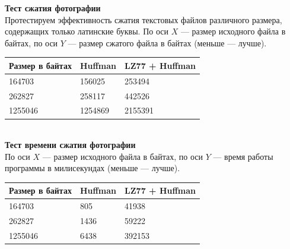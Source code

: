 \documentclass[12pt]{article}
\begin{document}
    \textbf{Тест сжатия фотографии} \\
    Протестируем эффективность сжатия текстовых файлов различного размера, 
    содержащих только латинские буквы. По оси $X$ — размер исходного файла в 
    байтах, по оси $Y$ — размер сжатого файла в байтах (меньше — лучше).


    \begin{tabular}{ | l | l | l | }
        \hline
            Размер в байтах & Huffman & LZ77 + Huffman \\ \hline
            164703          & 156025  & 253494         \\
            262827          & 258117  & 442526         \\
            1255046         & 1254869 & 2155391        \\
        \hline
    \end{tabular} \\

    \textbf{Тест времени сжатия фотографии} \\
    По оси $X$ — размер исходного файла в байтах, по оси $Y$ — время работы 
    программы в милисекундах (меньше — лучше).


    \begin{tabular}{ | l | l | l | }
        \hline
            Размер в байтах & Huffman & LZ77 + Huffman \\ \hline
            164703          & 805     & 41938          \\
            262827          & 1436    & 59222          \\
            1255046         & 6438    & 392153         \\
        \hline
    \end{tabular} \\
\end{document}
